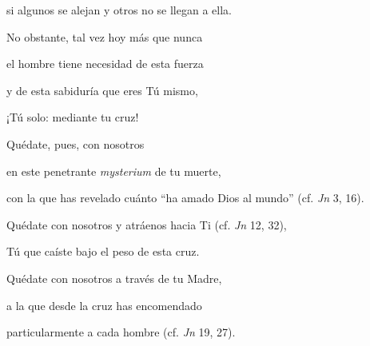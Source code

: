 			\begin{bodyprose}si algunos se alejan y otros no se llegan a ella.\end{bodyprose}
			
			\begin{bodyprose}No obstante, tal vez hoy más que nunca \end{bodyprose}
			
			\begin{bodyprose}el hombre tiene necesidad de esta fuerza \end{bodyprose}
			
			\begin{bodyprose}y de esta sabiduría que eres Tú mismo, \end{bodyprose}
			
			\begin{bodyprose}¡Tú solo: mediante tu cruz!\end{bodyprose}
			
			\begin{bodyprose}Quédate, pues, con nosotros \end{bodyprose}
			
			\begin{bodyprose}en este penetrante \textit{mysterium} de tu muerte, \end{bodyprose}
			
			\begin{bodyprose}con la que has revelado cuánto “ha amado Dios al mundo” (cf. \textit{Jn} 3, 16). \end{bodyprose}
			
			\begin{bodyprose}Quédate con nosotros y atráenos hacia Ti (cf. \textit{Jn} 12, 32), \end{bodyprose}
			
			\begin{bodyprose}Tú que caíste bajo el peso de esta cruz. \end{bodyprose}
			
			\begin{bodyprose}Quédate con nosotros a través de tu Madre, \end{bodyprose}
			
			\begin{bodyprose}a la que desde la cruz has encomendado \end{bodyprose}
			
			\begin{bodyprose}particularmente a cada hombre (cf. \textit{Jn} 19, 27).\end{bodyprose}
			
